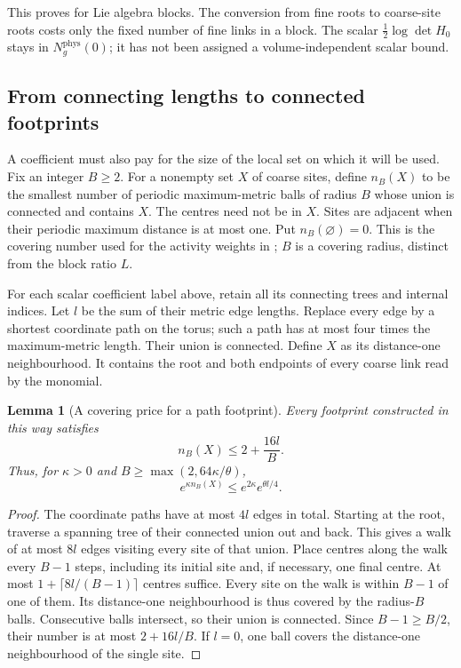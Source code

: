 \documentclass[11pt,reqno]{amsart}
\numberwithin{equation}{section}
\newtheorem{lemma}[theorem]{Lemma}
\theoremstyle{definition}
\theoremstyle{remark}
\begin{document}
This proves \cite[Proposition~16.5 and (16.11),
pp.~82--83]{Main} for Lie algebra blocks.
The conversion from fine roots to coarse-site roots
costs only the fixed number of fine links in a block.
The scalar \(\frac12\log\det H_0\) stays in
\(N_g^{\mathrm{phys}}(0)\); it has not been assigned a
volume-independent scalar bound.

\subsection{From connecting lengths to connected footprints}

A coefficient must also pay for the size of the
local set on which it will be used.
Fix an integer \(B\ge2\). For a nonempty set \(X\)
of coarse sites, define \(n_B(X)\) to be the smallest
number of periodic maximum-metric balls of radius
\(B\) whose union is connected and contains \(X\).
The centres need not be in \(X\).
Sites are adjacent when their periodic maximum
distance is at most one. Put \(n_B(\varnothing)=0\).
This is the covering number used for the activity
weights in \cite[Section~8.1, pp.~26--27]{Main};
\(B\) is a covering radius, distinct from the block
ratio \(L\).

For each scalar coefficient label above, retain
all its connecting trees and internal indices.
Let \(l\) be the sum of their metric edge lengths.
Replace every edge by a shortest coordinate path
on the torus; such a path has at most four times
the maximum-metric length.
Their union is connected. Define \(X\) as its
distance-one neighbourhood.
It contains the root and both endpoints of every
coarse link read by the monomial.

\begin{lemma}[A covering price for a path footprint]
\label{lem:local-footprint-cover}
Every footprint constructed in this way satisfies
\begin{equation}
                    n_B(X)\le2+\frac{16l}{B}.
 \label{eq:local-footprint-cover}
\end{equation}
Thus, for \(\kappa>0\) and
\(B\ge\max(2,64\kappa/\theta)\),
\[
                 e^{\kappa n_B(X)}
                         \le e^{2\kappa}e^{\theta l/4}.
\]
\end{lemma}
\begin{proof}
The coordinate paths have at most \(4l\) edges
in total. Starting at the root, traverse a spanning
tree of their connected union out and back.
This gives a walk of at most \(8l\) edges visiting
every site of that union.
Place centres along the walk every \(B-1\) steps,
including its initial site and, if necessary,
one final centre.
At most \(1+\lceil8l/(B-1)\rceil\) centres suffice.
Every site on the walk is within \(B-1\) of one
of them. Its distance-one neighbourhood is thus
covered by the radius-\(B\) balls.
Consecutive balls intersect, so their union is
connected. Since \(B-1\ge B/2\), their number
is at most \(2+16l/B\).
If \(l=0\), one ball covers the distance-one
neighbourhood of the single site.
\end{proof}
\end{document}
